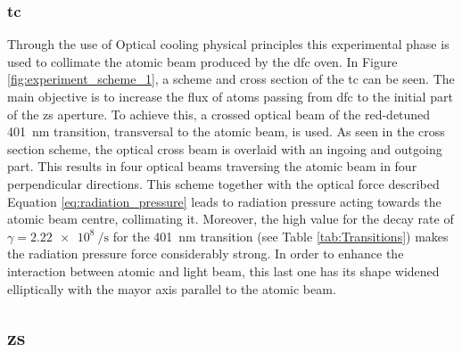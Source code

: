 \subsubsection{\Acl{tc}}

Through the use of Optical cooling physical principles this experimental phase is used to collimate the atomic beam produced by the \ac{dfc} oven. In Figure \ref{fig:experiment_scheme_1}, a scheme and cross section of the \ac{tc} can be seen. The main objective is to increase the flux of atoms passing from \ac{dfc} to the initial part of the \ac{zs} aperture. To achieve this, a crossed optical beam of the red-detuned \SI{401}{\nano\meter} transition, transversal to the atomic beam, is used. As seen in the cross section scheme, the optical cross beam is overlaid with an ingoing and outgoing part. This results in four optical beams traversing the atomic beam in four perpendicular directions. This scheme together with the optical force described Equation \ref{eq:radiation_pressure} leads to radiation pressure acting towards the atomic beam centre, collimating it. Moreover, the high value for the decay rate of $\gamma = \SI{2.22e8}{\per\second}$ for the \SI{401}{\nano\meter} transition (see Table \ref{tab:Transitions}) makes the radiation pressure force considerably strong. In order to enhance the interaction between atomic and light beam, this last one has its shape widened elliptically with the mayor axis parallel to the atomic beam.


\subsection{\Acl{zs}}


